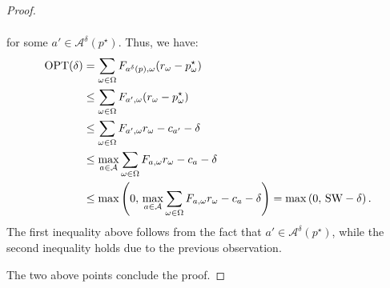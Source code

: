 \begin{proof}
\begin{enumerate}
\begin{enumerate}
\begin{align*}
			\end{align*}
			for some $a' \in \mathcal{A}^{\delta}(p^\star)$.
			Thus, we have:
			\begin{align*}
				\textnormal{OPT}(\delta)
				& = \sum_{\omega \in \Omega} F_{a^\delta(p),\omega} (r_\omega -p_\omega^\star ) \\
				& \le \sum_{\omega \in \Omega} F_{a',\omega} (r_\omega -p_\omega^\star ) \\
				& \le \sum_{\omega \in \Omega} F_{a',\omega} r_\omega - c_{a'}  - \delta \\
				& \le  \max_{a \in \mathcal{A}} \sum_{\omega \in \Omega}F_{a,\omega}r_\omega - c_a - \delta \\
				& \le \max\left(0, \, \max_{a \in \mathcal{A}} \sum_{\omega \in \Omega}F_{a,\omega}r_\omega - c_a - \delta \right) = \max\left(0, \, \textnormal{SW} - \delta \right).
			\end{align*}
			The first inequality above follows from the fact that $a' \in \mathcal{A}^{\delta}(p^\star)$, while the second inequality holds due to the previous observation.
		\end{enumerate}
	\end{enumerate}
	The two above points conclude the proof.
\end{proof}
%
\RealtionNonRobustTwo*
